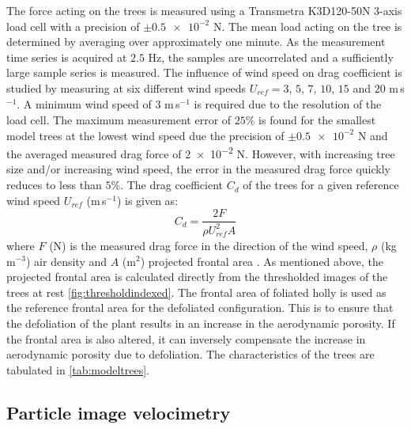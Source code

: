 The force acting on the trees is measured using a Transmetra K3D120-50N 3-axis load cell with a precision of $\pm \num{0.5e-2}$ N. The mean load acting on the tree is determined by averaging over approximately one minute. As the measurement time series is acquired at $2.5$ Hz, the samples are uncorrelated and a sufficiently large sample series is measured. The influence of wind speed on drag coefficient is studied by measuring at six different wind speeds $U_{\textit{ref}} = 3$, $5$, $7$, $10$, $15$ and $20$ m\,s$^{-1}$. A minimum wind speed of $3$ m\,s$^{-1}$ is required due to the resolution of the load cell. The maximum measurement error of $25$\% is found for the smallest model trees at the lowest wind speed due the precision of $\pm \num{0.5e-2}$ N and the averaged measured drag force of \num{2e-2} N. However, with increasing tree size and/or increasing wind speed, the error in the measured drag force quickly reduces to less than $5$\%. The drag coefficient $C_d$ of the trees for a given reference wind speed $U_{\textit{ref}}$ (m\,s$^{-1}$) is given as:
\begin{equation}
C_d = \frac{2F}{\rho U_{\textit{ref}}^2 A}
\label{eq:dragcoefficient}
\end{equation}
where $F$ (N) is the measured drag force in the direction of the wind speed, $\rho$ (kg\,m$^{-3}$) air density and $A$ (m$^{2}$) projected frontal area \citep{Grant1998,Guan2003,Mayhead1973}. As mentioned above, the projected frontal area is calculated directly from the thresholded images of the trees at rest \cref{fig:thresholdindexed}. The frontal area of foliated holly is used as the reference frontal area for the defoliated configuration. This is to ensure that the defoliation of the plant results in an increase in the aerodynamic porosity. If the frontal area is also altered, it can inversely compensate the increase in aerodynamic porosity due to defoliation. The characteristics of the trees are tabulated in \cref{tab:modeltrees}.

\subsection{Particle image velocimetry}

